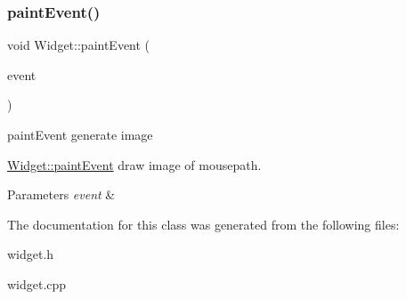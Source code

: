 \subsubsection{\texorpdfstring{paintEvent()}{paintEvent()}}
{\footnotesize\ttfamily void Widget\+::paint\+Event (\begin{DoxyParamCaption}\item[{Q\+Paint\+Event $\ast$}]{event }\end{DoxyParamCaption})\hspace{0.3cm}{\ttfamily [protected]}}



paint\+Event generate image 

\mbox{\hyperlink{class_widget_af755e8891f462562c88c37735345a798}{Widget\+::paint\+Event}} draw image of mousepath.


\begin{DoxyParams}{Parameters}
{\em event} & \\
\hline
\end{DoxyParams}


The documentation for this class was generated from the following files\+:\begin{DoxyCompactItemize}
\item 
widget.\+h\item 
widget.\+cpp\end{DoxyCompactItemize}
